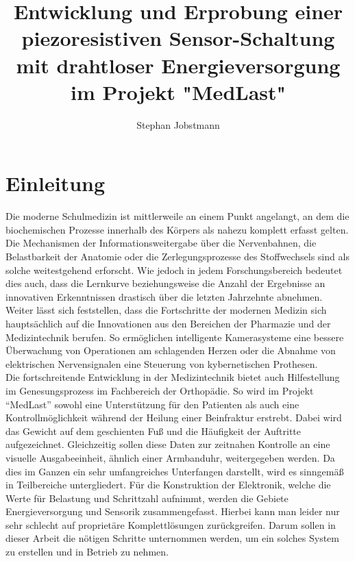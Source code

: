 \documentclass[12pt]{scrreprt} %
\title{Entwicklung und Erprobung einer piezoresistiven Sensor-Schaltung mit drahtloser Energieversorgung im Projekt "MedLast"}
\author{Stephan Jobstmann}
\date {}
\begin{document}
\maketitle
\setcounter {page}{1}
\def\chapterpagestyle{fancy}
\tableofcontents
\listoffigures
\listoftables
\lstset{language =C}
\chapter{Einleitung}
Die moderne Schulmedizin ist mittlerweile an einem Punkt angelangt, an dem die biochemischen Prozesse innerhalb des Körpers als nahezu komplett erfasst gelten. Die Mechanismen der Informationsweitergabe über die Nervenbahnen, die Belastbarkeit der Anatomie oder die Zerlegungsprozesse des Stoffwechsels sind als solche weitestgehend erforscht. Wie jedoch in jedem Forschungsbereich bedeutet dies auch, dass die Lernkurve beziehungsweise die Anzahl der Ergebnisse an innovativen Erkenntnissen drastisch über die letzten Jahrzehnte abnehmen. Weiter lässt sich feststellen, dass die Fortschritte der modernen Medizin sich hauptsächlich auf die Innovationen aus den Bereichen der Pharmazie und der Medizintechnik berufen. So ermöglichen intelligente Kamerasysteme eine bessere Überwachung von Operationen am schlagenden Herzen oder die Abnahme von elektrischen Nervensignalen eine Steuerung von kybernetischen Prothesen.\\
Die fortschreitende Entwicklung in der Medizintechnik bietet auch Hilfestellung im Genesungsprozess im Fachbereich der Orthopädie. So wird im Projekt "`MedLast"' sowohl eine Unterstützung für den Patienten als auch eine Kontrollmöglichkeit während der Heilung einer Beinfraktur erstrebt. Dabei wird das Gewicht auf dem geschienten Fuß und die Häufigkeit der Auftritte aufgezeichnet. Gleichzeitig sollen diese Daten zur zeitnahen Kontrolle an eine visuelle Ausgabeeinheit, ähnlich einer Armbanduhr, weitergegeben werden. Da dies im Ganzen ein sehr umfangreiches Unterfangen darstellt, wird es sinngemäß in Teilbereiche untergliedert. Für die Konstruktion der Elektronik, welche die Werte für Belastung und Schrittzahl aufnimmt, werden die Gebiete Energieversorgung und Sensorik zusammengefasst. Hierbei kann man leider nur sehr schlecht auf proprietäre Komplettlösungen zurückgreifen. Darum sollen in dieser Arbeit die nötigen Schritte unternommen werden, um ein solches System zu erstellen und in Betrieb zu nehmen.
\end{document}
